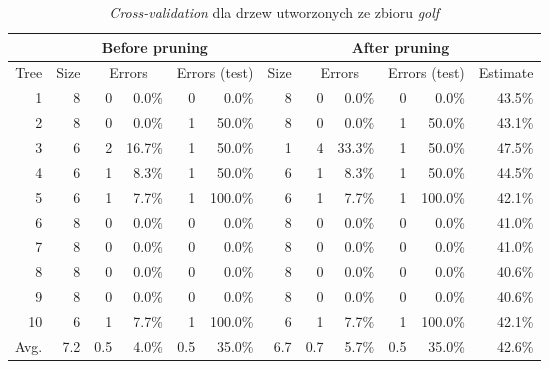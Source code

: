 \begin{table}
\begin{tabular}{|r||r|rr|rr||r|rr|rr|r|}
\hline
&\multicolumn{5}{c||}{Before pruning}&\multicolumn{6}{|c|}{After pruning} \\
\hline
Tree & 
Size & 
\multicolumn{2}{|c|}{Errors} & 
\multicolumn{2}{c||}{Errors (test)} & 
Size & 
\multicolumn{2}{|c|}{Errors} & 
\multicolumn{2}{|c|}{Errors (test)} & 
Estimate \\
\hline\hline
    1 &    8 &    0 &  0.0\% &    0 &   0.0\% &    8 &    0 &  0.0\% &    0 &   0.0\% &  43.5\%  \\
    2 &    8 &    0 &  0.0\% &    1 &  50.0\% &    8 &    0 &  0.0\% &    1 &  50.0\% &  43.1\%  \\
    3 &    6 &    2 & 16.7\% &    1 &  50.0\% &    1 &    4 & 33.3\% &    1 &  50.0\% &  47.5\%  \\
    4 &    6 &    1 &  8.3\% &    1 &  50.0\% &    6 &    1 &  8.3\% &    1 &  50.0\% &  44.5\%  \\
    5 &    6 &    1 &  7.7\% &    1 & 100.0\% &    6 &    1 &  7.7\% &    1 & 100.0\% &  42.1\%  \\
    6 &    8 &    0 &  0.0\% &    0 &   0.0\% &    8 &    0 &  0.0\% &    0 &   0.0\% &  41.0\%  \\
    7 &    8 &    0 &  0.0\% &    0 &   0.0\% &    8 &    0 &  0.0\% &    0 &   0.0\% &  41.0\%  \\
    8 &    8 &    0 &  0.0\% &    0 &   0.0\% &    8 &    0 &  0.0\% &    0 &   0.0\% &  40.6\%  \\
    9 &    8 &    0 &  0.0\% &    0 &   0.0\% &    8 &    0 &  0.0\% &    0 &   0.0\% &  40.6\%  \\
   10 &    6 &    1 &  7.7\% &    1 & 100.0\% &    6 &    1 &  7.7\% &    1 & 100.0\% &  42.1\%  \\
\hline\hline
 Avg. &  7.2 &  0.5 &  4.0\% &  0.5 &  35.0\% &  6.7 &  0.7 &  5.7\% &  0.5 &  35.0\% &  42.6\%  \\
\hline
\end{tabular}
\caption{\emph{Cross-validation} dla drzew utworzonych ze zbioru \emph{golf}}
\label{p2t2-golf-trees-cv}
\end{table}
